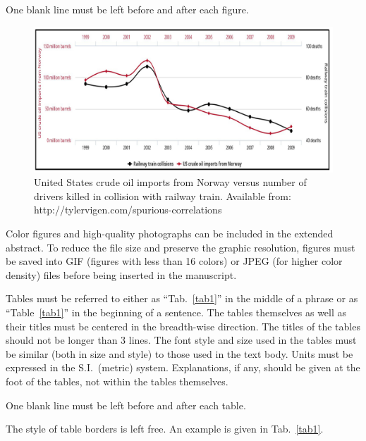 \documentclass[10pt,fleqn,a4paper,twoside]{article}
\begin{document}
One blank line must be left before and after each figure.

\begin{figure}[h!]
\centering
\includegraphics[angle=0, scale=0.320]{figure.jpeg}
\caption{United States crude oil imports from Norway versus number of drivers killed in collision with railway train. Available from: http://tylervigen.com/spurious-correlations}
\label{fig1}
\end{figure}

Color figures and high-quality photographs can be included in the extended abstract. To reduce the file size and preserve the graphic resolution, figures must be saved into GIF (figures with less than 16 colors) or JPEG (for higher color density) files before being inserted in the manuscript.

Tables must be referred to either as ``Tab.~\ref{tab1}'' in the middle of a phrase or as ``Table~\ref{tab1}'' in the beginning of a sentence.  The tables themselves as well as their titles must be centered in the breadth-wise direction. The titles of the tables should not be longer than 3 lines. The font style and size used in the tables must be similar (both in size and style) to those used in the text body. Units must be expressed in the S.I.\ (metric) system. Explanations, if any, should be given at the foot of the tables, not within the tables themselves.

One blank line must be left before and after each table.

The style of table borders is left free. An example is given in Tab.~\ref{tab1}.
\end{document}
